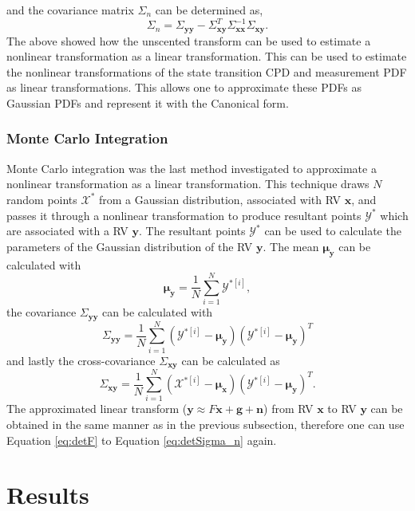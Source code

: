 \documentclass[12pt,oneside,openany,a4paper, %
afrikaans,english,
]{memoir}
\numberwithin{equation}{chapter}
\begin{document}
and the covariance matrix $\Sigma_n$ can be determined as,
\begin{equation}\label{eq:detSigma_n}
\Sigma_n = \Sigma_{\bm{yy}} - \Sigma_{\bm{xy}}^T\Sigma_{\bm{xx}}^{-1}\Sigma_{\bm{xy}}.
\end{equation} 
The above showed how the unscented transform can be used to estimate a nonlinear transformation as a linear transformation. This can be used to estimate the nonlinear transformations of the state transition CPD and measurement PDF as linear transformations. This allows one to approximate these PDFs as Gaussian PDFs and represent it with the Canonical form.
\subsection{Monte Carlo Integration}
Monte Carlo integration was the last method investigated to approximate a nonlinear transformation as a linear transformation. This technique draws $N$ random points $\mathcal{X}^*$ from a Gaussian distribution, associated with RV $\bm{x}$, and passes it through a nonlinear transformation to produce resultant points $\mathcal{Y}^*$ which are associated with a RV $\bm{y}$. The resultant points $\mathcal{Y}^*$ can be used to calculate the parameters of the Gaussian distribution of the RV $\bm{y}$. The mean $\bm{\mu_y}$ can be calculated with
\begin{equation}
\bm{\mu_y} =  \frac{1}{N}\sum_{i=1}^N\mathcal{Y}^{*[i]},
\end{equation}
the covariance $\Sigma_{\bm{yy}}$ can be calculated with
\begin{equation}
\Sigma_{\bm{yy}} = \frac{1}{N}\sum_{i=1}^N (\mathcal{Y}^{*[i]} - \bm{\mu_y})(\mathcal{Y}^{*[i]} - \bm{\mu_y})^T
\end{equation}
and lastly the cross-covariance $\Sigma_{\bm{xy}}$ can be calculated as
\begin{equation}
\Sigma_{\bm{xy}} = \frac{1}{N}\sum_{i=1}^N (\mathcal{X}^{*[i]} - \bm{\mu_x})(\mathcal{Y}^{*[i]} - \bm{\mu_y})^T.
\end{equation}
The approximated linear transform ($\bm{y} \approx F\bm{x} + \bm{g} + \bm{n}$) from RV $\bm{x}$ to RV $\bm{y}$ can be obtained in the same manner as in the previous subsection, therefore one can use Equation \ref{eq:detF} to Equation \ref{eq:detSigma_n} again.

\chapter{Results}
\end{document}
